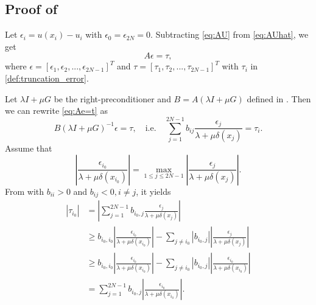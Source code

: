 \documentclass{amsart}
\theoremstyle{definition}
\theoremstyle{remark}
\numberwithin{equation}{section}
\begin{document}
\subsection{Proof of }
\label{subsec:proof-convergence}
Let \(\epsilon_i = u(x_i) - u_i\) with $\epsilon_0 = \epsilon_{2N} = 0$.
Subtracting \eqref{eq:AU} from \eqref{eq:AUhat}, we get %
\begin{equation} \label{eq:Ae=t}
    A \epsilon = \tau,
\end{equation}
where $\epsilon = [\epsilon_1, \epsilon_2, ... , \epsilon_{2N-1}]^T$ and $\tau=[\tau_1, \tau_2, ... , \tau_{2N-1}]^T$ with $\tau_i$ in \eqref{def:truncation_error}.

Let $\lambda I + \mu G$ be the right-preconditioner and $B=A(\lambda I + \mu G)$ defined in .
Then we can rewrite \eqref{eq:Ae=t} as %
\begin{equation*}
    B (\lambda I+ \mu G)^{-1} \epsilon = \tau,
    \quad \text{i.e.} \quad
  \sum_{j=1}^{2N-1} b_{ij} \frac{\epsilon_j}{\lambda + \mu \delta(x_j)} = \tau_i .
\end{equation*}
Assume that 
\begin{equation*}
  \left|\frac{\epsilon_{i_0}}{\lambda + \mu \delta(x_{i_0})} \right| 
  = \max_{1\le j\le 2N-1} \left|\frac{\epsilon_j}{\lambda + \mu \delta(x_j)} \right|. 
\end{equation*}
From  with $b_{ii} > 0$ and $b_{ij} < 0, i\neq j$, it yields
\begin{equation*}
  \begin{aligned}
    |\tau_{i_0}| &= \left|\sum_{j=1}^{2N-1} b_{i_0, j} \frac{\epsilon_j}{\lambda + \mu \delta(x_j)}\right|  \\
    &\ge b_{i_0, i_0} \left| \frac{\epsilon_{i_0}}{\lambda + \mu \delta(x_{i_0})} \right| - \sum_{j\ne i_0} |b_{i_0, j}| \left| \frac{\epsilon_j}{\lambda + \mu \delta(x_j)} \right| \\
    &\ge b_{i_0, i_0} \left| \frac{\epsilon_{i_0}}{\lambda + \mu \delta(x_{i_0})} \right| - \sum_{j\ne i_0} |b_{i_0, j}| \left|\frac{\epsilon_{i_0}}{\lambda + \mu \delta(x_{i_0})} \right| \\
    &= \sum_{j=1}^{2N-1} b_{i_0, j} \left|\frac{\epsilon_{i_0}}{\lambda + \mu \delta(x_{i_0})}\right|  .
  \end{aligned}
\end{equation*}
\end{document}
